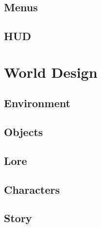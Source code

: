 \subsection{Menus}
\subsection{HUD}

\section{World Design}
\subsection{Environment}
\subsection{Objects}
\subsection{Lore}
\subsection{Characters}
\subsection{Story}

